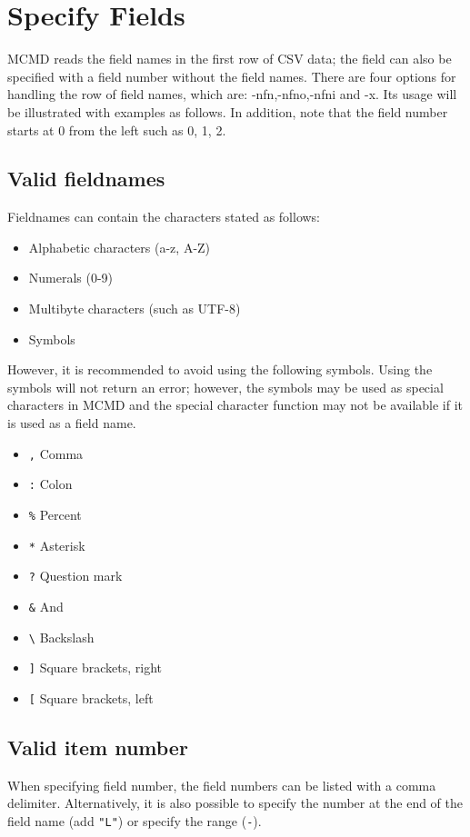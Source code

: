 
%

\section{Specify Fields\label{sect:fieldname}}
MCMD reads the field names in the first row of CSV data; the field can also be specified with a field number without the field names. There are four options for handling the row of field names, which are: -nfn,-nfno,-nfni and -x. Its usage will be illustrated with examples as follows. In addition, note that the field number starts at 0 from the left such as 0, 1, 2.



\subsection{Valid fieldnames}
Fieldnames can contain the characters stated as follows:

\begin{itemize}
\item Alphabetic characters (a-z, A-Z)
\item Numerals (0-9)
\item Multibyte characters (such as UTF-8)
\item Symbols
\end{itemize}

However, it is recommended to avoid using the following symbols. Using the symbols will not return an error; however, the symbols may be used as special characters in MCMD and the special character function may not be available if it is used as a field name.

\begin{itemize}
\item \verb|,| Comma
\item \verb|:| Colon
\item \verb|%| Percent
\item \verb|*| Asterisk
\item \verb|?| Question mark
\item \verb|&| And
\item \verb|\| Backslash
\item \verb|]| Square brackets, right
\item \verb|[| Square brackets, left
\end{itemize}

\subsection{Valid item number}
When specifying field number, the field numbers can be listed with a comma delimiter. Alternatively, it is also possible to specify the number at the end of the field name (add \verb|"L"|) or specify the range (\verb|-|).

